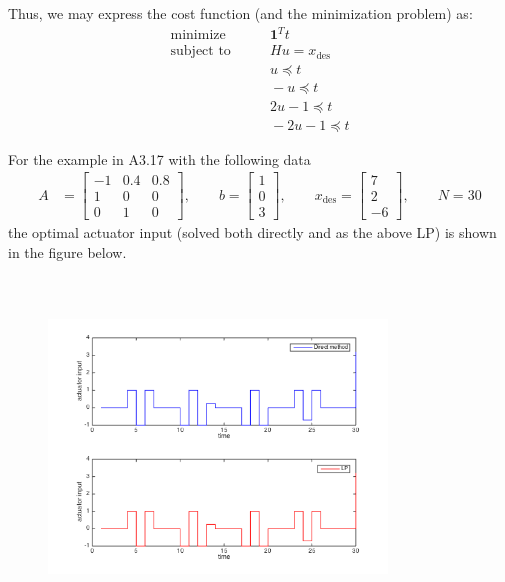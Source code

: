 \documentclass[a4paper,10pt]{article}
\begin{document}
Thus, we may express the cost function (and the minimization problem) as:
\begin{align}
\text{minimize} & \qquad \mathbf{1}^T t \nonumber \\
\text{subject~to} & \qquad Hu = x_{\text{des}} \nonumber\\
& \qquad  u \preceq t \nonumber \\
& \qquad  -u \preceq t \nonumber\\
& \qquad 2u-1 \preceq t \nonumber\\
& \qquad-2u-1\preceq t
\end{align}

For the example in A3.17 with the following data
\begin{align*}
A &= \begin{bmatrix}
-1 & 0.4 & 0.8 \\
1 & 0 & 0 \\
0 & 1 & 0
\end{bmatrix}, \qquad
b = \begin{bmatrix}
1 \\ 0 \\ 3
\end{bmatrix}, \qquad
x_{\text{des}} = \begin{bmatrix}
7 \\ 2 \\ -6
\end{bmatrix}, \qquad N = 30
\end{align*}
the optimal actuator input (solved both directly and as the above LP) is shown in the figure below.
\begin{figure}[ht]
\centering
  \includegraphics[width=9cm, height=9cm]{actuator_input.png}%
\end{figure}
\end{document}

